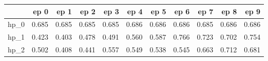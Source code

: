 \begin{tabular}{lrrrrrrrrrr}
\toprule
{} &   ep 0 &   ep 1 &   ep 2 &   ep 3 &   ep 4 &   ep 5 &   ep 6 &   ep 7 &   ep 8 &   ep 9 \\
\midrule
hp\_0 &  0.685 &  0.685 &  0.685 &  0.685 &  0.686 &  0.686 &  0.686 &  0.685 &  0.686 &  0.686 \\
hp\_1 &  0.423 &  0.403 &  0.478 &  0.491 &  0.560 &  0.587 &  0.766 &  0.723 &  0.702 &  0.754 \\
hp\_2 &  0.502 &  0.408 &  0.441 &  0.557 &  0.549 &  0.538 &  0.545 &  0.663 &  0.712 &  0.681 \\
\bottomrule
\end{tabular}

